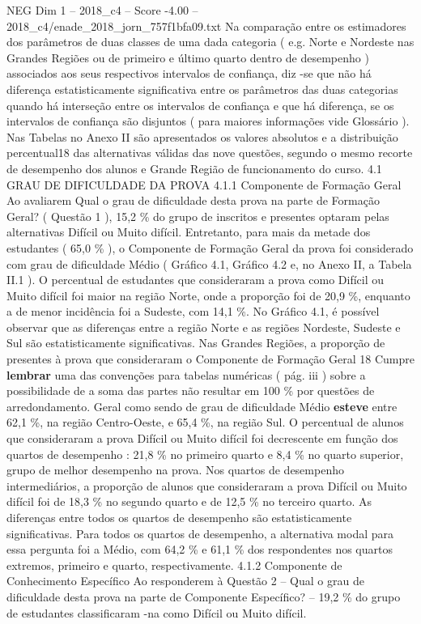 \begin{textsample}{NEG Dim 1 – 2018\_c4 – Score -4.00 – 2018\_c4/enade\_2018\_jorn\_757f1bfa09.txt}
Na comparação entre os estimadores dos parâmetros de duas classes de uma dada categoria ( e.g.
Norte e Nordeste nas Grandes Regiões ou de primeiro e último quarto dentro de desempenho ) associados aos seus respectivos intervalos de confiança, diz -se que não há diferença estatisticamente significativa entre os parâmetros das duas categorias quando há interseção entre os intervalos de confiança e que há diferença, se os intervalos de confiança são disjuntos ( para maiores informações vide Glossário ).
Nas Tabelas no Anexo II são apresentados os valores absolutos e a distribuição percentual18 das alternativas válidas das nove questões, segundo o mesmo recorte de desempenho dos alunos e Grande Região de funcionamento do curso. 4.1 GRAU DE DIFICULDADE DA PROVA 4.1.1 Componente de Formação Geral Ao avaliarem Qual o grau de dificuldade desta prova na parte de Formação Geral? ( Questão 1 ), 15,2 \% do grupo de inscritos e presentes optaram pelas alternativas Difícil ou Muito difícil.
Entretanto, para mais da metade dos estudantes ( 65,0 \% ), o Componente de Formação Geral da prova foi considerado com grau de dificuldade Médio ( Gráfico 4.1, Gráfico 4.2 e, no Anexo II, a Tabela II.1 ).
O percentual de estudantes que consideraram a prova como Difícil ou Muito difícil foi maior na região Norte, onde a proporção foi de 20,9 \%, enquanto a de menor incidência foi a Sudeste, com 14,1 \%.
No Gráfico 4.1, é possível observar que as diferenças entre a região Norte e as regiões Nordeste, Sudeste e Sul são estatisticamente significativas.
Nas Grandes Regiões, a proporção de presentes à prova que consideraram o Componente de Formação Geral 18 Cumpre \textbf{lembrar} uma das convenções para tabelas numéricas ( pág. iii ) sobre a possibilidade de a soma das partes não resultar em 100 \% por questões de arredondamento.
Geral como sendo de grau de dificuldade Médio \textbf{esteve} entre 62,1 \%, na região Centro-Oeste, e 65,4 \%, na região Sul.
O percentual de alunos que consideraram a prova Difícil ou Muito difícil foi decrescente em função dos quartos de desempenho : 21,8 \% no primeiro quarto e 8,4 \% no quarto superior, grupo de melhor desempenho na prova.
Nos quartos de desempenho intermediários, a proporção de alunos que consideraram a prova Difícil ou Muito difícil foi de 18,3 \% no segundo quarto e de 12,5 \% no terceiro quarto.
As diferenças entre todos os quartos de desempenho são estatisticamente significativas.
Para todos os quartos de desempenho, a alternativa modal para essa pergunta foi a Médio, com 64,2 \% e 61,1 \% dos respondentes nos quartos extremos, primeiro e quarto, respectivamente. 4.1.2 Componente de Conhecimento Específico Ao responderem à Questão 2 – Qual o grau de dificuldade desta prova na parte de Componente Específico? – 19,2 \% do grupo de estudantes classificaram -na como Difícil ou Muito difícil.

\end{textsample}
